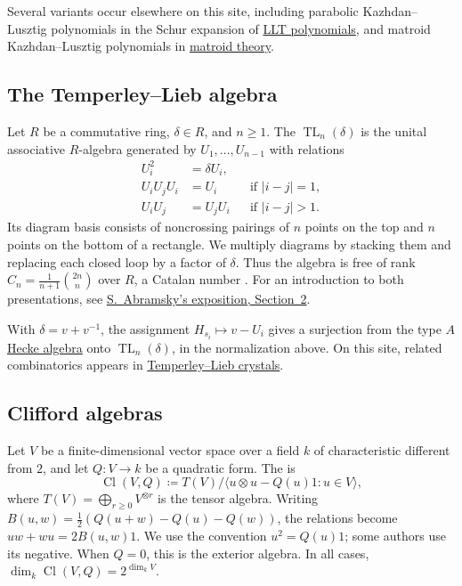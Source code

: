 Several variants occur elsewhere on this site, including parabolic
Kazhdan--Lusztig polynomials in the Schur expansion of
\hyperref[LLT]{LLT polynomials}, and matroid Kazhdan--Lusztig polynomials in
\hyperref[matroidKazhdanLusztigPolynomial]{matroid theory}.

\subsection[temperleyLiebAlgebra]{The Temperley--Lieb algebra}

Let $R$ be a commutative ring, $\delta\in R$, and $n\geq1$.
The  $\operatorname{TL}_n(\delta)$ is the
unital associative $R$-algebra generated by $U_1,\dotsc,U_{n-1}$ with relations
\begin{align*}
 U_i^2&=\delta U_i,\\
 U_iU_jU_i&=U_i &&\text{if }|i-j|=1,\\
 U_iU_j&=U_jU_i &&\text{if }|i-j|>1.
\end{align*}
Its diagram basis consists of noncrossing pairings of $n$ points on the top
and $n$ points on the bottom of a rectangle. We multiply diagrams by stacking
them and replacing each closed loop by a factor of $\delta$.
Thus the algebra is free of rank $C_n=\frac{1}{n+1}\binom{2n}{n}$ over $R$,
a Catalan number .
For an introduction to both presentations, see
\href{https://www.cs.ox.ac.uk/files/286/final.pdf}{S.~Abramsky's exposition, Section~2}.

With $\delta=v+v^{-1}$, the assignment $H_{s_i}\mapsto v-U_i$ gives a
surjection from the type $A$ \hyperref[heckeAlgebra]{Hecke algebra} onto
$\operatorname{TL}_n(\delta)$, in the normalization above.
On this site, related combinatorics appears in
\hyperref[temperleyLiebCrystal]{Temperley--Lieb crystals}.

\subsection[cliffordAlgebra]{Clifford algebras}

Let $V$ be a finite-dimensional vector space over a field $k$ of
characteristic different from $2$, and let $Q:V\to k$ be a quadratic form.
The  is
\[
 \operatorname{Cl}(V,Q)\coloneqq
 T(V)/\langle u\otimes u-Q(u)1:u\in V\rangle,
\]
where $T(V)=\bigoplus_{r\geq0}V^{\otimes r}$ is the tensor algebra.
Writing $B(u,w)=\frac12(Q(u+w)-Q(u)-Q(w))$, the relations become
$uw+wu=2B(u,w)1$. We use the convention $u^2=Q(u)1$;
some authors use its negative. When $Q=0$, this is the exterior algebra.
In all cases, $\dim_k\operatorname{Cl}(V,Q)=2^{\dim_k V}$.

